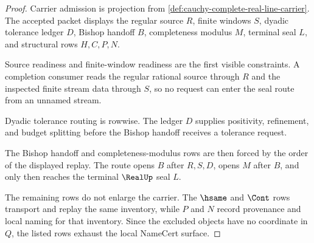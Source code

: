 \begin{proof}
Carrier admission is projection from \autoref{def:cauchy-complete-real-line-carrier}. The accepted packet displays the regular source $R$, finite windows $S$, dyadic tolerance ledger $D$, Bishop handoff $B$, completeness modulus $M$, terminal seal $L$, and structural rows $H,C,P,N$.

Source readiness and finite-window readiness are the first visible constraints. A completion consumer reads the regular rational source through $R$ and the inspected finite stream data through $S$, so no request can enter the seal route from an unnamed stream.

Dyadic tolerance routing is rowwise. The ledger $D$ supplies positivity, refinement, and budget splitting before the Bishop handoff receives a tolerance request.

The Bishop handoff and completeness-modulus rows are then forced by the order of the displayed replay. The route opens $B$ after $R,S,D$, opens $M$ after $B$, and only then reaches the terminal $\RealUp$ seal $L$.

The remaining rows do not enlarge the carrier. The $\hsame$ and $\Cont$ rows transport and replay the same inventory, while $P$ and $N$ record provenance and local naming for that inventory. Since the excluded objects have no coordinate in $Q$, the listed rows exhaust the local NameCert surface.
\end{proof}

